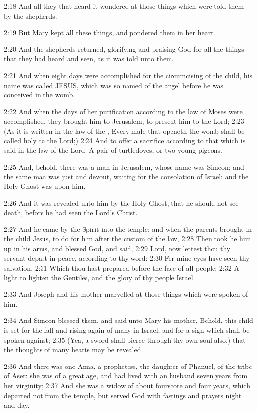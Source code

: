 2:18 And all they that heard it wondered at those things which were told them by the shepherds.

2:19 But Mary kept all these things, and pondered them in her heart.

2:20 And the shepherds returned, glorifying and praising God for all the things that they had heard and seen, as it was told unto them.

2:21 And when eight days were accomplished for the circumcising of the child, his name was called JESUS, which was so named of the angel before he was conceived in the womb.

2:22 And when the days of her purification according to the law of Moses were accomplished, they brought him to Jerusalem, to present him to the Lord; 2:23 (As it is written in the law of the \LORD, Every male that openeth the womb shall be called holy to the Lord;) 2:24 And to offer a sacrifice according to that which is said in the law of the Lord, A pair of turtledoves, or two young pigeons.

2:25 And, behold, there was a man in Jerusalem, whose name was Simeon; and the same man was just and devout, waiting for the consolation of Israel: and the Holy Ghost was upon him.

2:26 And it was revealed unto him by the Holy Ghost, that he should not see death, before he had seen the Lord's Christ.

2:27 And he came by the Spirit into the temple: and when the parents brought in the child Jesus, to do for him after the custom of the law, 2:28 Then took he him up in his arms, and blessed God, and said, 2:29 Lord, now lettest thou thy servant depart in peace, according to thy word: 2:30 For mine eyes have seen thy salvation, 2:31 Which thou hast prepared before the face of all people; 2:32 A light to lighten the Gentiles, and the glory of thy people Israel.

2:33 And Joseph and his mother marvelled at those things which were spoken of him.

2:34 And Simeon blessed them, and said unto Mary his mother, Behold, this child is set for the fall and rising again of many in Israel; and for a sign which shall be spoken against; 2:35 (Yea, a sword shall pierce through thy own soul also,) that the thoughts of many hearts may be revealed.

2:36 And there was one Anna, a prophetess, the daughter of Phanuel, of the tribe of Aser: she was of a great age, and had lived with an husband seven years from her virginity; 2:37 And she was a widow of about fourscore and four years, which departed not from the temple, but served God with fastings and prayers night and day.

